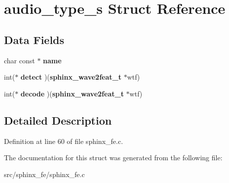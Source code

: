 \section{audio\-\_\-type\-\_\-s Struct Reference}
\label{structaudio__type__s}
\subsection*{Data Fields}
\begin{DoxyCompactItemize}
\item 
char const $\ast$ {\bfseries name}\label{structaudio__type__s_a5fa19a5507e0c89c1f3113813ffd6442}

\item 
int($\ast$ {\bfseries detect} )({\bf sphinx\-\_\-wave2feat\-\_\-t} $\ast$wtf)\label{structaudio__type__s_a1c98b5bf62f7b171c7fb4eda26a72ea1}

\item 
int($\ast$ {\bfseries decode} )({\bf sphinx\-\_\-wave2feat\-\_\-t} $\ast$wtf)\label{structaudio__type__s_a034b6a0bede5a89d9bb4b45c9ff525f3}

\end{DoxyCompactItemize}


\subsection{Detailed Description}


Definition at line 60 of file sphinx\-\_\-fe.\-c.



The documentation for this struct was generated from the following file\-:\begin{DoxyCompactItemize}
\item 
src/sphinx\-\_\-fe/sphinx\-\_\-fe.\-c\end{DoxyCompactItemize}
